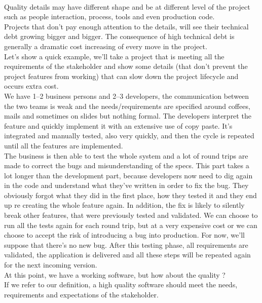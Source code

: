 \\
Quality details may have different shape and be at different level of the
project such as people interaction, process, tools and even production code. \\
\newline
Projects that don't pay enough attention to the details, will see their
technical debt growing bigger and bigger.
The consequence of high technical debt is generally a dramatic
cost increasing of every move in the project. \\
Let's show a quick example, we'll take a project that is meeting all the
requirements of the stakeholder and show some details (that don't prevent
the project features from working) that can slow down the project lifecycle
and occurs extra cost. \\
\newline
We have 1--2 business persons and 2--3 developers, the communication between
the two teams is weak and the needs/requirements are specified around
coffees, mails and sometimes on slides but nothing formal.
The developers interpret the feature and quickly implement it with an extensive
use of copy paste.
It's integrated and manually tested, also very quickly, and then the cycle
is repeated until all the features are implemented. \\
The business is then able to test the whole system and a lot of round trips
are made to correct the bugs and misunderstanding of the specs.
This part takes a lot longer than the development part, because developers
now need to dig again in the code and understand what they've written in
order to fix the bug.
They obviously forgot what they did in the first place, how they tested it
and they end up re creating the whole feature again.
In addition, the fix is likely to silently break other features, that were
previously tested and validated.
We can choose to run all the tests again for each round trip, but at a very
expensive cost or we can choose to accept the risk of introducing a bug into
production.
For now, we'll suppose that there's no new bug.
After this testing phase, all requirements are validated, the application is
delivered and all these steps will be repeated again for the next incoming
version. \\
\newline
At this point, we have a working software, but how about the quality ? \\
If we refer to our definition, a high quality software should meet the needs,
requirements and expectations of the stakeholder.
